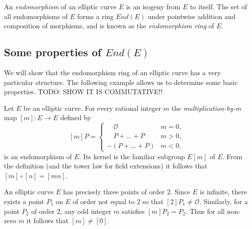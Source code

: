 An \emph{endomorphism} of an elliptic curve $E$ is an isogeny from $E$ to itself.
The set of all endomorphisms of $E$ forms a ring $End(E)$ under pointwise addition
and composition of morphisms, and is known as the \emph{endomorphism ring} of $E$.

\subsection{Some properties of $End(E)$}
\label{sec:some-properties-ende}

We will show that the endomorphism ring of an elliptic curve has a very particular
structure.  The following example allows us to determine some basic properties.
TODO: SHOW IT IS COMMUTATIVE!!

\begin{example}
  \label{ex:mult-by-m}
  Let $E$ be an elliptic curve.  For every rational integer $m$ the
  \emph{multiplication-by-m} map $\left[m\right] \colon E \rightarrow E$ defined by
  \begin{equation*}
    \left[ m \right] P =
    \begin{cases}
      \quad \mathcal{O} & m = 0,\\
      \quad P + \ldots + P & m > 0,\\
      - \left( P + \ldots + P \right) & m < 0,
    \end{cases}
  \end{equation*}
  is an endomorphism of $E$.  Its kernel is the familiar subgroup $E \left[ m
  \right]$ of $E$.  From the definition (and the tower law for field extensions) it
  follows that $\left[m\right] \circ \left[n\right] = \left[mn\right]$.
\end{example}

An elliptic curve $E$ has precisely three points of order 2.  Since $E$ is infinite,
there exists a point $P_{1}$ on $E$ of order not equal to 2 so that
$\left[2\right]P_{1} \neq \mathcal{O}$.  Similarly, for a point $P_{2}$ of order 2,
any odd integer $m$ satisfies $\left[m\right]P_{2} = P_{2}$.  Thus for all non-zero
$m$ it follows that $\left[m\right] \neq \left[0\right]$.

